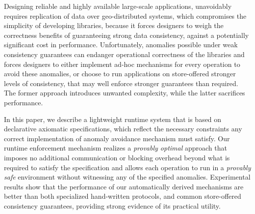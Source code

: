 
  Designing reliable and highly available large-scale applications, unavoidably
  requires replication of data over geo-distributed systems, which
  compromises the simplicity of developing libraries, because
  it forces designers to weigh the correctness
  benefits of guaranteeing strong data consistency, against a potentially
  significant cost in performance. 
  Unfortunately, anomalies possible under weak consistency guarantees
  can endanger operational correctness of the libraries and
  forces designers to either implement
  ad-hoc mechanisms for every operation to avoid these anomalies, or
  choose to run applications on store-offered stronger levels of
  consistency, that may well enforce stronger guarantees than
  required. The former approach introduces unwanted complexity,
  while the latter sacrifices performance.



  In this paper, we describe a lightweight runtime system that is
  based on declarative axiomatic specifications, 
  which reflect the necessary constraints any 
  correct implementation of anomaly avoidance mechanism
  must satisfy.  
  Our runtime enforcement mechanism realizes a \emph{provably optimal} approach
  that imposes no additional communication or
  blocking overhead beyond what is required to satisfy the
  specification and allows each operation to run in a \emph{provably
  safe} environment
  without witnessing any of the specified anomalies. 
  Experimental results show that the
  performance of our automatically derived mechanisms are  better than
  both specialized hand-written protocols, and common store-offered
  consistency guarantees, providing strong evidence of its
  practical utility.
